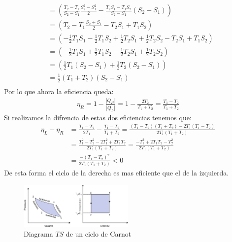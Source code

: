 \documentclass[a4paper]{article}
\begin{document}
\begin{answer}
\begin{itemize}
\begin{align*}
                &= \left( \frac{T_2 - T_1 }{S_2 - S_1} \frac{S_2^2 - S_1^2}{2} - \frac{T_2S_1 - T_1S_2}{S_2 - S_1} (S_2 - S_1)\right)\\
                &=\left( T_2 - T_1 \frac{S_2 + S_1}{2} - T_2S_1 + T_1S_2\right)\\
                &= \left(-\frac 12 T_1S_1 - \frac 12 T_1 S_2 + \frac 12 T_2 S_1 + \frac 12 T_2 S_2  - T_2S_1 +T_1S_2\right)\\
                &= \left( -\frac 12 T_1 S_1 + \frac 12 T_1 S_2 - \frac 12 T_2 S_1 + \frac 12 T_2 S_2 \right)\\
                &= \left( \frac 12 T_1 (S_2 - S_1) + \frac 12 T_2 (S_2- S_1) \right)\\
                &= \frac 12 (T_1 + T_2) (S_2 - S_1)\\
            \end{align*}
            Por lo que ahora la eficiencia queda:
            \begin{align*}
                \eta_R = 1 - \frac{|Q_H|}{|Q_L|} = 1 - \frac{2T_2}{T_1 + T_2} = \frac{T_1 - T_2}{T_1+T_2}
            \end{align*}
            Si realizamos la difrencia de estas dos eficiencias tenemos que:
            \begin{align*}
                \eta_L - \eta_R &= \frac{T_1 - T_2}{2T_1} - \frac{T_1 - T_2}{T_1+T_2} = \frac{(T_1 - T_2)(T_1 + T_2) - 2T_1(T_1 - T_2)}{2T_1(T_1 + T_2)}\\
                &= \frac {T_1^2 - T_2^2 - 2T_1^2 + 2T_1T_2}{2T_1(T_1 + T_2)} = \frac{-T_1^2 + 2T_1T_2 - T_2^2}{2T_1(T_1 + T_2)}\\
                &= \frac{-(T_1 - T_2)^2}{2T_1(T_1 + T_2)} < 0 
            \end{align*}
            De esta forma el ciclo de la derecha es mas eficiente que el de la izquierda.

        \end{itemize}
        
    \end{answer}

    \begin{figure}[h]
        \centering
        \includegraphics[width=0.5\textwidth]{Diagrama3.png}
        \caption{Diagrama $TS$ de un ciclo de Carnot}
    \end{figure}
\end{document}
